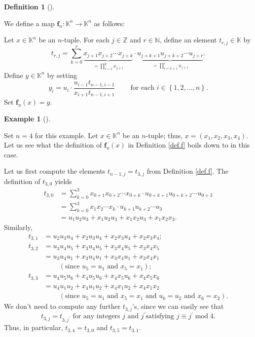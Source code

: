 \documentclass[numbers=enddot,12pt,final,onecolumn,notitlepage]{scrartcl}%
\theoremstyle{definition}
\newtheorem{defi}[theo]{Definition}
\newenvironment{definition}[1][]
{\begin{defi}[#1]\begin{leftbar}}
{\end{leftbar}\end{defi}}
\newtheorem{exam}[theo]{Example}
\newenvironment{example}[1][]
{\begin{exam}[#1]\begin{leftbar}}
{\end{leftbar}\end{exam}}
\let\sumnonlimits\sum
\let\prodnonlimits\prod
\renewcommand{\sum}{\sumnonlimits\limits}
\renewcommand{\prod}{\prodnonlimits\limits}
\begin{document}
\begin{definition}
\label{def.f}We define a map $\mathbf{f}_{u}:\mathbb{K}^{n}\rightarrow
\mathbb{K}^{n}$ as follows:

Let $x\in\mathbb{K}^{n}$ be an $n$-tuple. For each $j\in\mathbb{Z}$ and
$r\in\mathbb{N}$, define an element $t_{r,j}\in\mathbb{K}$ by
\[
t_{r,j}=\sum_{k=0}^{r}\underbrace{x_{j+1}x_{j+2}\cdots x_{j+k}}_{=\prod
_{i=1}^{k}x_{j+i}}\cdot\underbrace{u_{j+k+1}u_{j+k+2}\cdots u_{j+r}}%
_{=\prod_{i=k+1}^{r}u_{j+i}}.
\]
Define $y\in\mathbb{K}^{n}$ by setting%
\[
y_{i}=u_{i}\cdot\dfrac{u_{i-1}t_{n-1,i-1}}{x_{i+1}t_{n-1,i+1}}%
\ \ \ \ \ \ \ \ \ \ \text{for each }i\in\left\{  1,2,\ldots,n\right\}  .
\]
Set $\mathbf{f}_{u}\left(  x\right)  =y$.
\end{definition}

\begin{example}
\label{exa.f.4}Set $n=4$ for this example. Let $x\in\mathbb{K}^{n}$ be an
$n$-tuple; thus, $x=\left(  x_{1},x_{2},x_{3},x_{4}\right)  $. Let us see what
the definition of $\mathbf{f}_{u}\left(  x\right)  $ in Definition \ref{def.f}
boils down to in this case.

Let us first compute the elements $t_{n-1,j}=t_{3,j}$ from Definition
\ref{def.f}. The definition of $t_{3,0}$ yields%
\begin{align*}
t_{3,0}  &  =\sum_{k=0}^{3}x_{0+1}x_{0+2}\cdots x_{0+k}\cdot u_{0+k+1}%
u_{0+k+2}\cdots u_{0+3}\\
&  =\sum_{k=0}^{3}x_{1}x_{2}\cdots x_{k}\cdot u_{k+1}u_{k+2}\cdots u_{3}\\
&  =u_{1}u_{2}u_{3}+x_{1}u_{2}u_{3}+x_{1}x_{2}u_{3}+x_{1}x_{2}x_{3}.
\end{align*}
Similarly,%
\begin{align*}
t_{3,1}  &  =u_{2}u_{3}u_{4}+x_{2}u_{3}u_{4}+x_{2}x_{3}u_{4}+x_{2}x_{3}%
x_{4};\\
t_{3,2}  &  =u_{3}u_{4}u_{5}+x_{3}u_{4}u_{5}+x_{3}x_{4}u_{5}+x_{3}x_{4}x_{5}\\
&  =u_{3}u_{4}u_{1}+x_{3}u_{4}u_{1}+x_{3}x_{4}u_{1}+x_{3}x_{4}x_{1}\\
&  \ \ \ \ \ \ \ \ \ \ \left(  \text{since }u_{5}=u_{1}\text{ and }x_{5}%
=x_{1}\right)  ;\\
t_{3,3}  &  =u_{4}u_{5}u_{6}+x_{4}u_{5}u_{6}+x_{4}x_{5}u_{6}+x_{4}x_{5}x_{6}\\
&  =u_{4}u_{1}u_{2}+x_{4}u_{1}u_{2}+x_{4}x_{1}u_{2}+x_{4}x_{1}x_{2}\\
&  \ \ \ \ \ \ \ \ \ \ \left(  \text{since }u_{5}=u_{1}\text{ and }x_{5}%
=x_{1}\text{ and }u_{6}=u_{2}\text{ and }x_{6}=x_{2}\right)  .
\end{align*}
We don't need to compute any further $t_{3,j}$'s, since we can easily see that%
\begin{equation}
t_{3,j}=t_{3,j^{\prime}}\text{ for any integers }j\text{ and }j^{\prime}\text{
satisfying }j\equiv j^{\prime}\operatorname{mod}4. \label{eq.exa.f.4.3}%
\end{equation}
Thus, in particular, $t_{3,4}=t_{3,0}$ and $t_{3,5}=t_{3,1}$.


\end{example}
\end{document}
